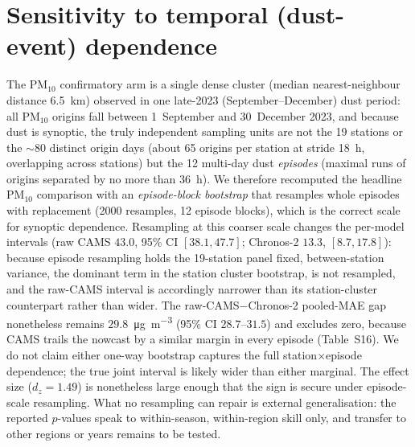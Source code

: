 \documentclass[11pt]{article}
\newcommand*{\pmten}{\ensuremath{\mathrm{PM_{10}}}}
\begin{document}
\section{Sensitivity to temporal (dust-event) dependence}
The \pmten{} confirmatory arm is a single dense cluster (median nearest-neighbour distance 6.5~km) observed in one late-2023 (September--December) dust period: all \pmten{} origins fall between 1~September and 30~December 2023, and because dust is synoptic, the truly independent sampling units are not the 19 stations or the $\sim$80 distinct origin days (about 65 origins per station at stride 18~h, overlapping across stations) but the 12 multi-day dust \emph{episodes} (maximal runs of origins separated by no more than 36~h). We therefore recomputed the headline \pmten{} comparison with an \emph{episode-block bootstrap} that resamples whole episodes with replacement (2000 resamples, 12 episode blocks), which is the correct scale for synoptic dependence. Resampling at this coarser scale changes the per-model intervals (raw CAMS $43.0$, 95\% CI $[38.1, 47.7]$; Chronos-2 $13.3$, $[8.7, 17.8]$): because episode resampling holds the 19-station panel fixed, between-station variance, the dominant term in the station cluster bootstrap, is not resampled, and the raw-CAMS interval is accordingly narrower than its station-cluster counterpart rather than wider. The raw-CAMS$-$Chronos-2 pooled-MAE gap nonetheless remains $29.8$~\si{\micro\gram\per\cubic\metre} (95\% CI $28.7$--$31.5$) and excludes zero, because CAMS trails the nowcast by a similar margin in every episode (Table~S16). We do not claim either one-way bootstrap captures the full station$\times$episode dependence; the true joint interval is likely wider than either marginal. The effect size ($d_z=1.49$) is nonetheless large enough that the sign is secure under episode-scale resampling. What no resampling can repair is external generalisation: the reported $p$-values speak to within-season, within-region skill only, and transfer to other regions or years remains to be tested.
\end{document}
